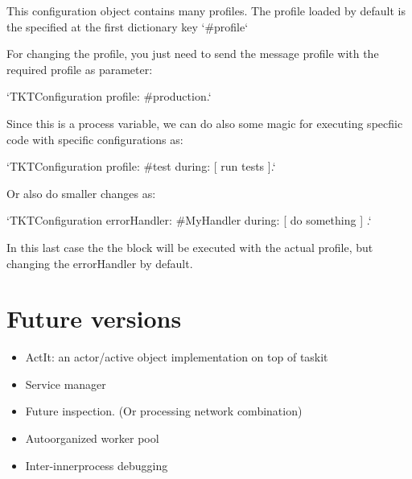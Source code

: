 \documentclass[10pt,twoside,english]{_support/latex/sbabook/sbabook}
\begin{document}
This configuration object contains many profiles. 
The profile loaded by default is the specified at the first dictionary key `\#profile`

For changing the profile, you just need to send the message profile with the required profile as parameter:

`TKTConfiguration profile: \#production.`

Since this is a process variable, we can do also some magic for executing specfiic code with specific configurations as:

`TKTConfiguration profile: \#test during: {[} run tests {]}.`

Or also do smaller changes as:

`TKTConfiguration errorHandler: \#MyHandler during: {[} do something {]} .`

In this last case the the block will be executed with the actual profile, but changing the errorHandler by default. 
\chapter{Future versions}
\begin{itemize}
\item ActIt: an actor/active object implementation on top of taskit
\item Service manager
\item Future inspection. (Or processing network combination) 
\item Autoorganized worker pool
\item Inter-innerprocess debugging
\end{itemize}


\backmatter

\end{document}
